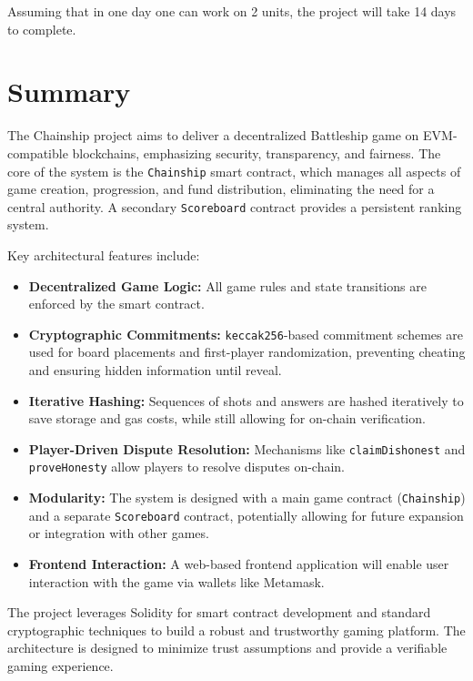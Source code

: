 \documentclass{article}
\begin{document}
    Assuming that in one day one can work on 2 units, the project will take 14 days to complete.

    \section{Summary}

    The Chainship project aims to deliver a decentralized Battleship game on EVM-compatible blockchains, emphasizing security, transparency, and fairness. The core of the system is the \texttt{Chainship} smart contract, which manages all aspects of game creation, progression, and fund distribution, eliminating the need for a central authority. A secondary \texttt{Scoreboard} contract provides a persistent ranking system.

    Key architectural features include:
    \begin{itemize}
        \item \textbf{Decentralized Game Logic:} All game rules and state transitions are enforced by the smart contract.
        \item \textbf{Cryptographic Commitments:} \texttt{keccak256}-based commitment schemes are used for board placements and first-player randomization, preventing cheating and ensuring hidden information until reveal.
        \item \textbf{Iterative Hashing:} Sequences of shots and answers are hashed iteratively to save storage and gas costs, while still allowing for on-chain verification.
        \item \textbf{Player-Driven Dispute Resolution:} Mechanisms like \texttt{claimDishonest} and \texttt{proveHonesty} allow players to resolve disputes on-chain.
        \item \textbf{Modularity:} The system is designed with a main game contract (\texttt{Chainship}) and a separate \texttt{Scoreboard} contract, potentially allowing for future expansion or integration with other games.
        \item \textbf{Frontend Interaction:} A web-based frontend application will enable user interaction with the game via wallets like Metamask.
    \end{itemize}
    The project leverages Solidity for smart contract development and standard cryptographic techniques to build a robust and trustworthy gaming platform. The architecture is designed to minimize trust assumptions and provide a verifiable gaming experience.
\end{document}
